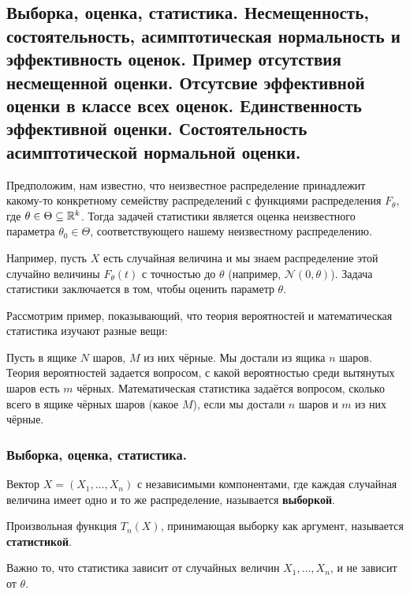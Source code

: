\subsection{Выборка, оценка, статистика. Несмещенность, состоятельность, асимптотическая нормальность и эффективность оценок. Пример отсутствия несмещенной оценки. Отсутсвие эффективной оценки в классе всех оценок. Единственность эффективной оценки. Состоятельность асимптотической нормальной оценки.}

Предположим, нам известно, что неизвестное распределение принадлежит какому-то конкретному семейству распределений с функциями распределения $F_{\theta}$, где $\theta \in \Theta \subseteq \mathbb{R}^k$. Тогда задачей статистики является оценка неизвестного параметра $\theta_0 \in \Theta$, соответствующего нашему неизвестному распределению.

Например, пусть $X$ есть случайная величина и мы знаем распределение этой случайно величины $F_{\theta}(t)$ с точностью до $\theta$ (например, $\mathcal{N}(0, \theta)$). Задача статистики заключается в том, чтобы оценить параметр $\theta$.

Рассмотрим пример, показывающий, что теория вероятностей и математическая статистика изучают разные вещи:
\begin{example}
    Пусть в ящике $N$ шаров, $M$ из них чёрные. Мы достали из ящика $n$ шаров. Теория вероятностей задается вопросом, с какой вероятностью среди вытянутых шаров есть $m$ чёрных. Математическая статистика задаётся вопросом, сколько всего в ящике чёрных шаров (какое $M$), если мы достали $n$ шаров и $m$ из них чёрные.
\end{example}

\subsubsection{Выборка, оценка, статистика.}

\begin{definition*}
    Вектор $X = (X_1, \dots, X_n)$ с независимыми компонентами, где каждая случайная величина имеет одно и то же распределение, называется \textbf{выборкой}.
\end{definition*}

\begin{definition*}
    Произвольная функция $T_n(X)$, принимающая выборку как аргумент, называется \textbf{статистикой}.
\end{definition*}

Важно то, что статистика зависит от случайных величин $X_1, \dots, X_n$, и не зависит от $\theta$.

